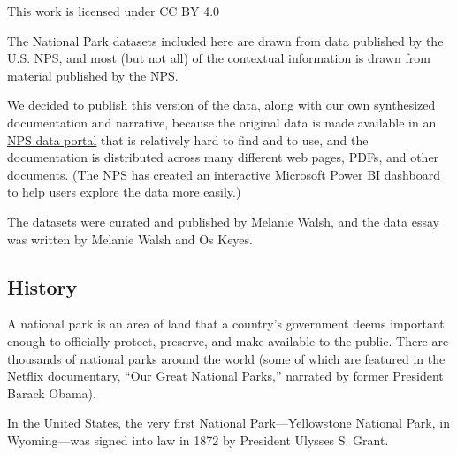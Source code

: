 \documentclass[
  letterpaper,
  DIV=11,
  numbers=noendperiod]{scrartcl}
\begin{document}
\begin{tcolorbox}[enhanced jigsaw, title={Creative Commons License}, opacityback=0, bottomtitle=1mm, left=2mm, coltitle=black, opacitybacktitle=0.6, breakable, arc=.35mm, colframe=quarto-callout-tip-color-frame, toprule=.15mm, rightrule=.15mm, colback=white, colbacktitle=quarto-callout-tip-color!10!white, leftrule=.75mm, toptitle=1mm, titlerule=0mm, bottomrule=.15mm]

This work is licensed under CC BY 4.0

\end{tcolorbox}

The National Park datasets included here are drawn from data published
by the U.S. NPS, and most (but not all) of the contextual information is
drawn from material published by the NPS.

We decided to publish this version of the data, along with our own
synthesized documentation and narrative, because the original data is
made available in an \href{https://irma.nps.gov/Stats/}{NPS data portal}
that is relatively hard to find and to use, and the documentation is
distributed across many different web pages, PDFs, and other documents.
(The NPS has created an interactive
\href{https://www.nps.gov/subjects/socialscience/visitor-use-statistics-dashboard.htm}{Microsoft
Power BI dashboard} to help users explore the data more easily.)

The datasets were curated and published by Melanie Walsh, and the data
essay was written by Melanie Walsh and Os Keyes.

\subsection{History}\label{history}

A national park is an area of land that a country's government deems
important enough to officially protect, preserve, and make available to
the public. There are thousands of national parks around the world (some
of which are featured in the Netflix documentary,
\href{https://www.netflix.com/title/81086133}{``Our Great National
Parks,''} narrated by former President Barack Obama).

In the United States, the very first National Park---Yellowstone
National Park, in Wyoming---was signed into law in 1872 by President
Ulysses S. Grant.
\end{document}
